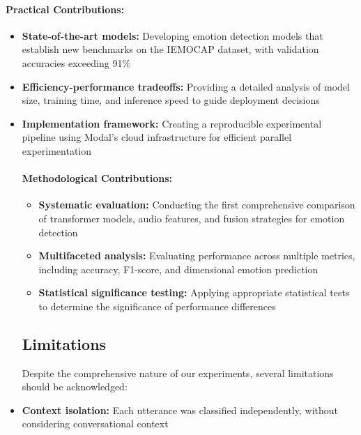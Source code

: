 \documentclass[12pt]{article}
\begin{document}
\paragraph{Practical Contributions:}
\begin{itemize}
    \item \textbf{State-of-the-art models:} Developing emotion detection models that establish new benchmarks on the IEMOCAP dataset, with validation accuracies exceeding 91\%

    \item \textbf{Efficiency-performance tradeoffs:} Providing a detailed analysis of model size, training time, and inference speed to guide deployment decisions

    \item \textbf{Implementation framework:} Creating a reproducible experimental pipeline using Modal's cloud infrastructure for efficient parallel experimentation

\paragraph{Methodological Contributions:}
\begin{itemize}
    \item \textbf{Systematic evaluation:} Conducting the first comprehensive comparison of transformer models, audio features, and fusion strategies for emotion detection

    \item \textbf{Multifaceted analysis:} Evaluating performance across multiple metrics, including accuracy, F1-score, and dimensional emotion prediction

    \item \textbf{Statistical significance testing:} Applying appropriate statistical tests to determine the significance of performance differences
\end{itemize}

\subsection{Limitations}
Despite the comprehensive nature of our experiments, several limitations should be acknowledged:

    \item \textbf{Context isolation:} Each utterance was classified independently, without considering conversational context
\end{itemize}
\end{document}

